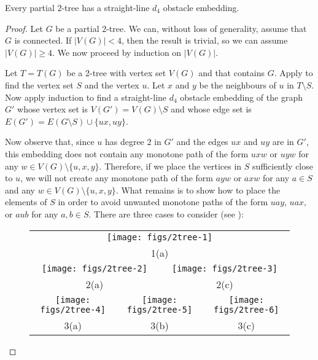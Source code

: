 \documentclass{patmorin}
\begin{document}
\begin{thm}
  Every partial 2-tree has a straight-line $d_4$ obstacle embedding.
\end{thm}

\begin{proof}
  Let $G$ be a partial 2-tree. We can, without loss of generality, assume
  that $G$ is connected.  If $|V(G)|< 4$, then the result is trivial, so
  we can assume $|V(G)|\ge 4$.  We now proceed by induction on $|V(G)|$.

  Let $T=T(G)$ be a 2-tree with vertex set $V(G)$ and that contains $G$.
  Apply  to find the vertex set $S$ and the vertex $u$.
  Let $x$ and $y$ be the neighbours of $u$ in $T\setminus S$. Now apply
  induction to find a straight-line $d_4$ obstacle embedding of the
  graph $G'$ whose vertex set is $V(G')=V(G)\setminus S$ and whose edge
  set is $E(G')=E(G\setminus S)\cup\{ux,uy\}$.

  Now observe that, since $u$ has degree 2 in $G'$ and the edges $ux$
  and $uy$ are in $G'$, this embedding does not contain any monotone path
  of the form $uxw$ or $uyw$ for any $w\in V(G)\setminus\{u,x,y\}$.
  Therefore, if we place the vertices in $S$ sufficiently close to $u$,
  we will not create any monotone path of the form $ayw$ or $axw$ for
  any $a\in S$ and any $w\in V(G)\setminus \{u,x,y\}$.  What remains
  is to show how to place the elements of $S$ in order to avoid unwanted
  monotone paths of the form $uay$, $uax$, or $aub$ for any $a,b\in S$.
  There are three cases to consider (see ):

  \begin{figure}
    \begin{tabular}{cccccc}
       \multicolumn{6}{c}{\texttt{[image: figs/2tree-1]}} \\
       \multicolumn{6}{c}{1(a)} \\
       \multicolumn{3}{c}{\texttt{[image: figs/2tree-2]}} & 
       \multicolumn{3}{c}{\texttt{[image: figs/2tree-3]}} \\
       \multicolumn{3}{c}{2(a)} &
       \multicolumn{3}{c}{2(c)} \\
       \multicolumn{2}{c}{\texttt{[image: figs/2tree-4]}} &
       \multicolumn{2}{c}{\texttt{[image: figs/2tree-5]}} &
       \multicolumn{2}{c}{\texttt{[image: figs/2tree-6]}} \\
       \multicolumn{2}{c}{3(a)} &
       \multicolumn{2}{c}{3(b)} &
       \multicolumn{2}{c}{3(c)} 
    \end{tabular}
  \end{figure}
  

\end{proof}
\end{document}
